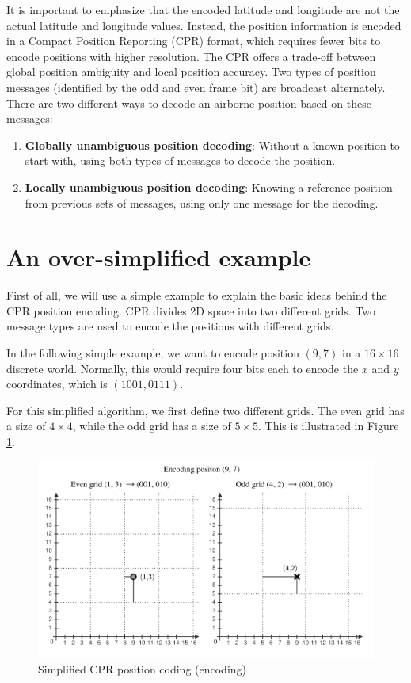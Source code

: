 It is important to emphasize that the encoded latitude and longitude are not the actual latitude and longitude values. Instead, the position information is encoded in a Compact Position Reporting (CPR) format, which requires fewer bits to encode positions with higher resolution. The CPR offers a trade-off between global position ambiguity and local position accuracy. Two types of position messages (identified by the odd and even frame bit) are broadcast alternately. There are two different ways to decode an airborne position based on these messages:

\begin{enumerate}
\item \textbf{Globally unambiguous position decoding}: Without a known position to start with, using both types of messages to decode the position.
\item \textbf{Locally unambiguous position decoding}: Knowing a reference position from previous sets of messages, using only one message for the decoding.
\end{enumerate}


\section{An over-simplified example}
First of all, we will use a simple example to explain the basic ideas behind the CPR position encoding. CPR divides 2D space into two different grids. Two message types are used to encode the positions with different grids.

In the following simple example, we want to encode position $(9, 7)$ in a $16\times16$ discrete world. Normally, this would require four bits each to encode the $x$ and $y$ coordinates, which is $(1001, 0111)$.

For this simplified algorithm, we first define two different grids. The even grid has a size of $4\times4$, while the odd grid has a size of $5\times5$. This is illustrated in Figure \ref{fig:cpr_simple_1}.


\begin{figure}[!ht]
  \includegraphics[width=0.9\linewidth]{figures/adsb/cpr_simple_1.pdf}
  \caption{Simplified CPR position coding (encoding)}
  \label{fig:cpr_simple_1}
\end{figure}

